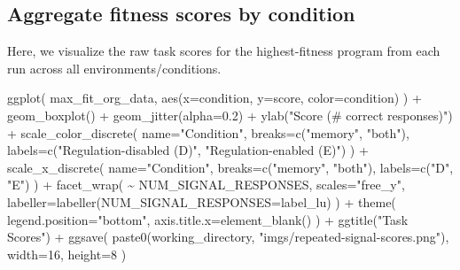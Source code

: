 \documentclass[
]{book}
\newenvironment{Shaded}{\begin{snugshade}}{\end{snugshade}}
\newcommand{\AttributeTok}[1]{\textcolor[rgb]{0.77,0.63,0.00}{#1}}
\newcommand{\DecValTok}[1]{\textcolor[rgb]{0.00,0.00,0.81}{#1}}
\newcommand{\FloatTok}[1]{\textcolor[rgb]{0.00,0.00,0.81}{#1}}
\newcommand{\FunctionTok}[1]{\textcolor[rgb]{0.00,0.00,0.00}{#1}}
\newcommand{\NormalTok}[1]{#1}
\newcommand{\SpecialCharTok}[1]{\textcolor[rgb]{0.00,0.00,0.00}{#1}}
\newcommand{\StringTok}[1]{\textcolor[rgb]{0.31,0.60,0.02}{#1}}
\begin{document}
\hypertarget{aggregate-fitness-scores-by-condition}{%
\subsection{Aggregate fitness scores by condition}\label{aggregate-fitness-scores-by-condition}}

Here, we visualize the raw task scores for the highest-fitness program from each run across all environments/conditions.

\begin{Shaded}
\begin{Highlighting}[]
\FunctionTok{ggplot}\NormalTok{( max\_fit\_org\_data, }\FunctionTok{aes}\NormalTok{(}\AttributeTok{x=}\NormalTok{condition, }\AttributeTok{y=}\NormalTok{score, }\AttributeTok{color=}\NormalTok{condition) ) }\SpecialCharTok{+}
  \FunctionTok{geom\_boxplot}\NormalTok{() }\SpecialCharTok{+}
  \FunctionTok{geom\_jitter}\NormalTok{(}\AttributeTok{alpha=}\FloatTok{0.2}\NormalTok{) }\SpecialCharTok{+}
  \FunctionTok{ylab}\NormalTok{(}\StringTok{"Score (\# correct responses)"}\NormalTok{) }\SpecialCharTok{+}
  \FunctionTok{scale\_color\_discrete}\NormalTok{(}
    \AttributeTok{name=}\StringTok{"Condition"}\NormalTok{,}
    \AttributeTok{breaks=}\FunctionTok{c}\NormalTok{(}\StringTok{"memory"}\NormalTok{, }\StringTok{"both"}\NormalTok{),}
    \AttributeTok{labels=}\FunctionTok{c}\NormalTok{(}\StringTok{"Regulation{-}disabled (D)"}\NormalTok{, }\StringTok{"Regulation{-}enabled (E)"}\NormalTok{)}
\NormalTok{  ) }\SpecialCharTok{+}
  \FunctionTok{scale\_x\_discrete}\NormalTok{(}
    \AttributeTok{name=}\StringTok{"Condition"}\NormalTok{,}
    \AttributeTok{breaks=}\FunctionTok{c}\NormalTok{(}\StringTok{"memory"}\NormalTok{, }\StringTok{"both"}\NormalTok{),}
    \AttributeTok{labels=}\FunctionTok{c}\NormalTok{(}\StringTok{"D"}\NormalTok{, }\StringTok{"E"}\NormalTok{)}
\NormalTok{  ) }\SpecialCharTok{+}
  \FunctionTok{facet\_wrap}\NormalTok{(}
    \SpecialCharTok{\textasciitilde{}}\NormalTok{ NUM\_SIGNAL\_RESPONSES,}
    \AttributeTok{scales=}\StringTok{"free\_y"}\NormalTok{,}
    \AttributeTok{labeller=}\FunctionTok{labeller}\NormalTok{(}\AttributeTok{NUM\_SIGNAL\_RESPONSES=}\NormalTok{label\_lu)}
\NormalTok{  ) }\SpecialCharTok{+}
  \FunctionTok{theme}\NormalTok{(}
    \AttributeTok{legend.position=}\StringTok{"bottom"}\NormalTok{,}
    \AttributeTok{axis.title.x=}\FunctionTok{element\_blank}\NormalTok{()}
\NormalTok{  ) }\SpecialCharTok{+}
  \FunctionTok{ggtitle}\NormalTok{(}\StringTok{"Task Scores"}\NormalTok{) }\SpecialCharTok{+}
  \FunctionTok{ggsave}\NormalTok{(}
    \FunctionTok{paste0}\NormalTok{(working\_directory, }\StringTok{"imgs/repeated{-}signal{-}scores.png"}\NormalTok{),}
    \AttributeTok{width=}\DecValTok{16}\NormalTok{,}
    \AttributeTok{height=}\DecValTok{8}
\NormalTok{  )}
\end{Highlighting}
\end{Shaded}
\end{document}
